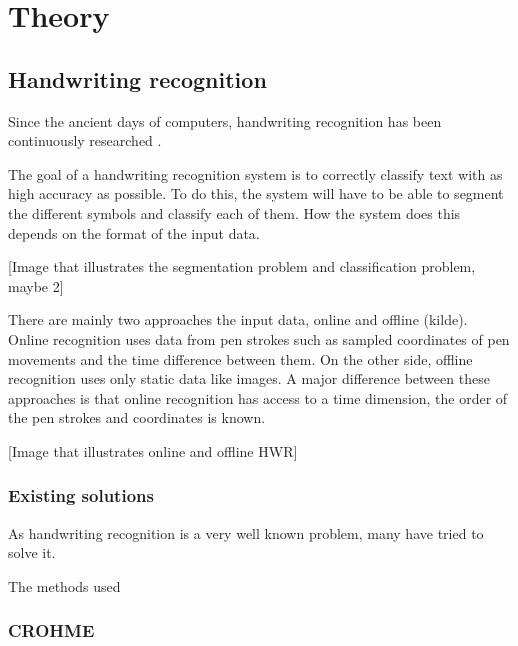 \chapter{Theory}

\section{Handwriting recognition}
% 
Since the ancient days of computers, handwriting recognition has been continuously researched \cite{simon_off-line_1992}. %

The goal of a handwriting recognition system is to correctly classify text with as high accuracy as possible. To do this, the system will have to be able to segment the different symbols and classify each of them. How the system does this depends on the format of the input data.

[Image that illustrates the segmentation problem and classification problem, maybe 2]

There are mainly two approaches the input data, online and offline (kilde). Online recognition uses data from pen strokes such as sampled coordinates of pen movements and the time difference between them. On the other side, offline recognition uses only static data like images. A major difference between these approaches is that online recognition has access to a time dimension, the order of the pen strokes and coordinates is known. 

[Image that illustrates online and offline HWR]



\subsection{Existing solutions}
% 
As handwriting recognition is a very well known problem, many have tried to solve it.

The methods used


\subsection{CROHME}


